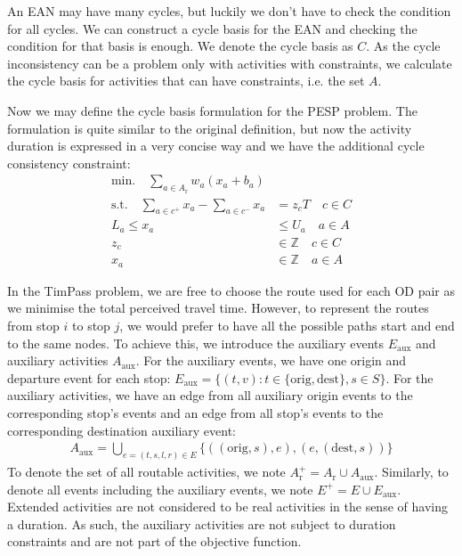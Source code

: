 \documentclass[english, 12pt, a4paper, sci, utf8, a-2b, online]{aaltothesis}
\newcommand{\Z}{\mathbb{Z}}
\newcommand{\Eaux}{E_\text{aux}}
\newcommand{\Ep}{E^+}
\newcommand{\Aaux}{A_\text{aux}}
\newcommand{\Ar}{A_\text{r}}
\newcommand{\Arp}{A_\text{r}^+}
\begin{document}
An EAN may have many cycles, but luckily we don't have to check the condition for all cycles. We can construct a cycle basis for the EAN and checking the condition for that basis is enough. We denote the cycle basis as $C$. As the cycle inconsistency can be a problem only with activities with constraints, we calculate the cycle basis for activities that can have constraints, i.e. the set $A$.



Now we may define the cycle basis formulation for the PESP problem. The formulation is quite similar to the original definition, but now the activity duration is expressed in a very concise way and we have the additional cycle consistency constraint:
\begin{align}
    \textrm{min.} \quad  \sum_{a \in \Ar} w_{a} (x_a + b_a) \\
    \textrm{s.t.} \quad  \sum_{a\in c^+} x_a - \sum_{a\in c^-} x_a & = z_c T \quad c \in C \\
    L_a \leq x_a & \leq U_a \quad a \in A \\
    z_c &\in \Z \quad c \in C \\
    x_a &\in \Z \quad a \in A
\end{align}

In the TimPass problem, we are free to choose the route used for each OD pair as we minimise the total perceived travel time. However, to represent the routes from stop $i$ to stop $j$, we would prefer to have all the possible paths start and end to the same nodes. To achieve this, we introduce the auxiliary events $\Eaux$ and auxiliary activities $\Aaux$. For the auxiliary events, we have one origin and departure event for each stop: $\Eaux = \{(t, v) : t \in \{\text{orig}, \text{dest}\}, s \in S\}$. For the auxiliary activities, we have an edge from all auxiliary origin events to the corresponding stop's events and an edge from all stop's events to the corresponding destination auxiliary event:
\begin{align}
    \Aaux = \bigcup_{e = (t, s, l, r) \in E}\{((\text{orig}, s), e), (e, (\text{dest}, s))\}
\end{align}
To denote the set of all routable activities, we note $\Arp = \Ar \cup \Aaux$. Similarly, to denote all events including the auxiliary events, we note $\Ep = E \cup \Eaux$. Extended activities are not considered to be real activities in the sense of having a duration. As such, the auxiliary activities are not subject to duration constraints and are not part of the objective function.
\end{document}
